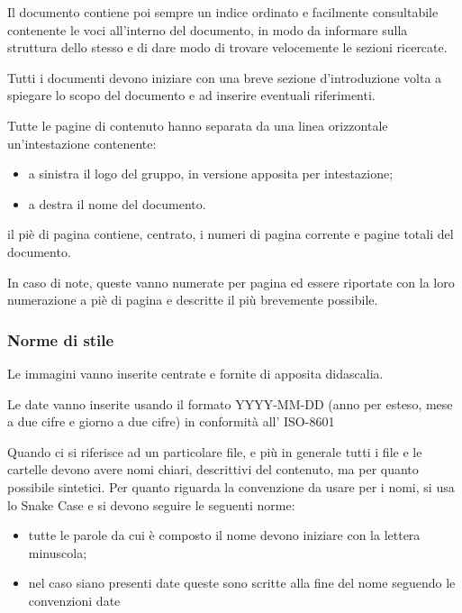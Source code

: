 	    Il documento contiene poi sempre un indice ordinato e facilmente consultabile contenente le voci all'interno del documento, in modo da informare sulla struttura dello stesso e di dare modo di trovare velocemente le sezioni ricercate.
	    
	    
	    Tutti i documenti devono iniziare con una breve sezione d'introduzione volta a spiegare lo scopo del documento e ad inserire eventuali riferimenti.
	    
	    
	    Tutte le pagine di contenuto hanno separata da una linea orizzontale un'intestazione contenente:
	    \begin{itemize}
	        \item a sinistra il logo del gruppo, in versione apposita per intestazione;
	        \item a destra il nome del documento.
	    \end{itemize}
	    
	    
	    il piè di pagina contiene, centrato, i numeri di pagina corrente e pagine totali del documento.
	    
	    
	    In caso di note, queste vanno numerate per pagina ed essere riportate con la loro numerazione a piè di pagina e descritte il più brevemente possibile.
	    
	    
	    
	    \subsubsection{Norme di stile}
	    
	    Le immagini vanno inserite centrate e fornite di apposita didascalia.
	     
	     
	    Le date vanno inserite usando il formato YYYY-MM-DD (anno per esteso, mese a due cifre e giorno a due cifre) in conformità all' ISO-8601
	    
	    Quando ci si riferisce ad un particolare file, e più in generale tutti i file e le cartelle devono avere nomi chiari, descrittivi del contenuto, ma per quanto possibile sintetici.
	    Per quanto riguarda la convenzione da usare per i nomi, si usa lo Snake Case e si devono seguire le seguenti norme:
	    \begin{itemize}
	        \item tutte le parole da cui è composto il nome devono iniziare con la lettera minuscola;
	        \item nel caso siano presenti date queste sono scritte alla fine del nome seguendo le convenzioni date
	    \end{itemize}
	    

